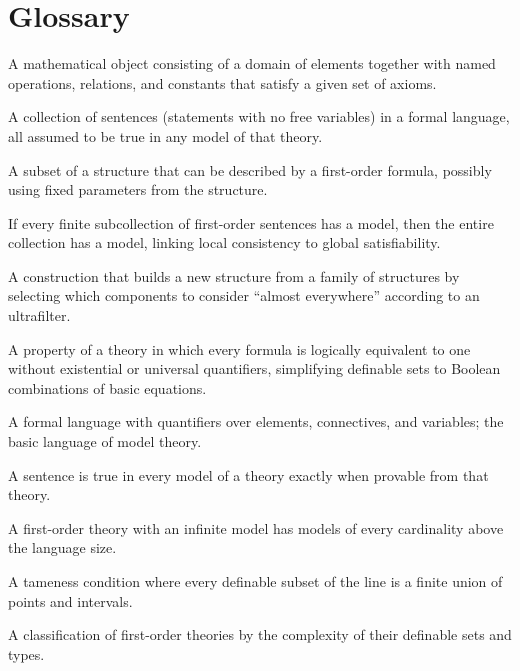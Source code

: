 \section*{Glossary}
\begin{description}[leftmargin=*,style=nextline,itemsep=0.3em]
\item[\textbf{Structure.}] A mathematical object consisting of a domain of elements together with named operations, relations, and constants that satisfy a given set of axioms.
\item[\textbf{Theory.}] A collection of sentences (statements with no free variables) in a formal language, all assumed to be true in any model of that theory.
\item[\textbf{Definable set.}] A subset of a structure that can be described by a first-order formula, possibly using fixed parameters from the structure.
\item[\textbf{Compactness theorem.}] If every finite subcollection of first-order sentences has a model, then the entire collection has a model, linking local consistency to global satisfiability.
\item[\textbf{Ultraproduct.}] A construction that builds a new structure from a family of structures by selecting which components to consider ``almost everywhere'' according to an ultrafilter.
\item[\textbf{Quantifier elimination.}] A property of a theory in which every formula is logically equivalent to one without existential or universal quantifiers, simplifying definable sets to Boolean combinations of basic equations.
\item[\textbf{First-order logic.}] A formal language with quantifiers over elements, connectives, and variables; the basic language of model theory.
\item[\textbf{Completeness theorem.}] A sentence is true in every model of a theory exactly when provable from that theory.
\item[\textbf{L\"owenheim--Skolem theorem.}] A first-order theory with an infinite model has models of every cardinality above the language size.
\item[\textbf{O-minimality.}] A tameness condition where every definable subset of the line is a finite union of points and intervals.
\item[\textbf{Stability theory.}] A classification of first-order theories by the complexity of their definable sets and types.
\end{description}

